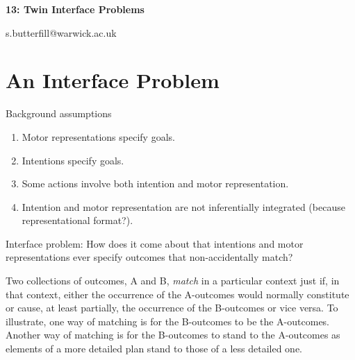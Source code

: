 \documentclass[12pt]{extarticle}
\date{}
\makeatletter
\def \ititle {Philosophical Psychology}
\def \iemail{s.butterfill@warwick.ac.uk}
\makeatother
\begin{document}
\begin{multicols*}{3}

\setlength\footnotesep{1em}









      
\def \ititle {13: Twin Interface Problems}
 
\begin{center}
 
{\Large
 
\textbf{\ititle}
 
}
 
 
 
\iemail %
 
\end{center}
 
 
 
\section{An Interface Problem}
 
Background assumptions
\begin{enumerate}
  \item Motor representations specify goals.
  \item Intentions specify goals.
  \item  Some actions involve both intention and motor representation.
  \item  Intention and motor representation are not inferentially integrated (because representational format?).
\end{enumerate}

Interface problem: How does it come about that intentions and motor representations
ever specify outcomes that non-accidentally match?

Two collections of outcomes, A and B, \emph{match} in a particular context just if, in that context,
either the occurrence of the A-outcomes would normally constitute or cause, at least partially, the
occurrence of the B-outcomes or vice versa. To illustrate, one way of matching is for the B-outcomes
to be the A-outcomes. Another way of matching is for the B-outcomes to stand to the A-outcomes as
elements of a more detailed plan stand to those of a less detailed one.


\end{multicols*}
\end{document}
